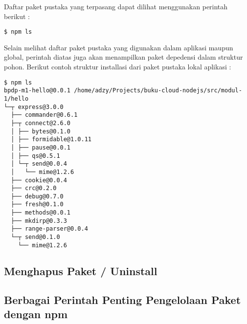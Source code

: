 Daftar paket pustaka yang terpasang dapat dilihat menggunakan perintah berikut :

\lstset{language=bash,caption=Hasil instalasi Flatiron}
\begin{lstlisting}
$ npm ls
\end{lstlisting}

Selain melihat daftar paket pustaka yang digunakan dalam aplikasi maupun global, perintah diatas juga akan menampilkan paket depedensi dalam struktur pohon. Berikut contoh struktur installasi dari paket pustaka lokal aplikasi :

\lstset{language=bash,caption=Hasil instalasi Flatiron}
\begin{lstlisting}
$ npm ls
bpdp-m1-hello@0.0.1 /home/adzy/Projects/buku-cloud-nodejs/src/modul-1/hello
└─┬ express@3.0.0 
  ├── commander@0.6.1 
  ├─┬ connect@2.6.0 
  │ ├── bytes@0.1.0 
  │ ├── formidable@1.0.11 
  │ ├── pause@0.0.1 
  │ ├── qs@0.5.1 
  │ └─┬ send@0.0.4 
  │   └── mime@1.2.6 
  ├── cookie@0.0.4 
  ├── crc@0.2.0 
  ├── debug@0.7.0 
  ├── fresh@0.1.0 
  ├── methods@0.0.1 
  ├── mkdirp@0.3.3 
  ├── range-parser@0.0.4 
  └─┬ send@0.1.0 
    └── mime@1.2.6 
\end{lstlisting}

\subsection{Menghapus Paket / Uninstall}

\subsection{Berbagai Perintah Penting Pengelolaan Paket dengan npm}

